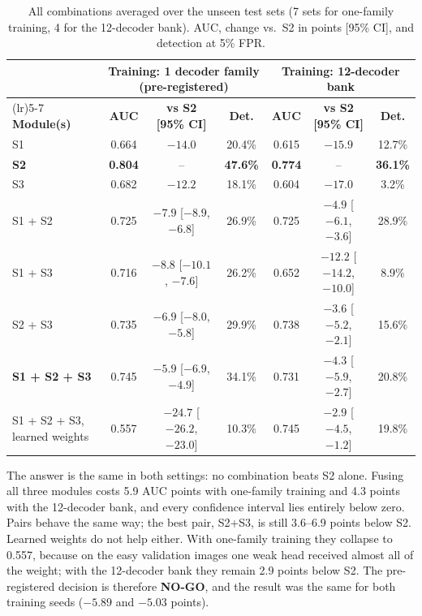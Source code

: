 \begin{table}[H]
\centering
\footnotesize
\caption{All combinations averaged over the unseen test sets (7 sets for one-family training, 4 for the 12-decoder bank). AUC, change vs.\ S2 in points [95\% CI], and detection at 5\% FPR.}
\label{tab:fusion}
\setlength{\tabcolsep}{3.5pt}
\begin{tabular}{>{\raggedright\arraybackslash}p{2.6cm} ccc ccc}
\toprule
& \multicolumn{3}{c}{\textbf{Training: 1 decoder family (pre-registered)}} & \multicolumn{3}{c}{\textbf{Training: 12-decoder bank}} \\
\cmidrule(lr){2-4}\cmidrule(lr){5-7}
\textbf{Module(s)} & \textbf{AUC} & \textbf{vs S2 [95\% CI]} & \textbf{Det.} & \textbf{AUC} & \textbf{vs S2 [95\% CI]} & \textbf{Det.} \\
\midrule
S1 & 0.664 & $-14.0$ & 20.4\% & 0.615 & $-15.9$ & 12.7\% \\
\textbf{S2} & \textbf{0.804} & -- & \textbf{47.6\%} & \textbf{0.774} & -- & \textbf{36.1\%} \\
S3 & 0.682 & $-12.2$ & 18.1\% & 0.604 & $-17.0$ & 3.2\% \\
\midrule
S1 + S2 & 0.725 & $-7.9$ [$-8.9$, $-6.8$] & 26.9\% & 0.725 & $-4.9$ [$-6.1$, $-3.6$] & 28.9\% \\
S1 + S3 & 0.716 & $-8.8$ [$-10.1$, $-7.6$] & 26.2\% & 0.652 & $-12.2$ [$-14.2$, $-10.0$] & 8.9\% \\
S2 + S3 & 0.735 & $-6.9$ [$-8.0$, $-5.8$] & 29.9\% & 0.738 & $-3.6$ [$-5.2$, $-2.1$] & 15.6\% \\
\textbf{S1 + S2 + S3} & 0.745 & $\mathbf{-5.9}$ [$-6.9$, $-4.9$] & 34.1\% & 0.731 & $\mathbf{-4.3}$ [$-5.9$, $-2.7$] & 20.8\% \\
S1 + S2 + S3, learned weights & 0.557 & $-24.7$ [$-26.2$, $-23.0$] & 10.3\% & 0.745 & $-2.9$ [$-4.5$, $-1.2$] & 19.8\% \\
\bottomrule
\end{tabular}
\end{table}

The answer is the same in both settings: no combination beats S2 alone. Fusing all three modules costs 5.9 AUC points with one-family training and 4.3 points with the 12-decoder bank, and every confidence interval lies entirely below zero. Pairs behave the same way; the best pair, S2+S3, is still 3.6--6.9 points below S2. Learned weights do not help either. With one-family training they collapse to 0.557, because on the easy validation images one weak head received almost all of the weight; with the 12-decoder bank they remain 2.9 points below S2. The pre-registered decision is therefore \textbf{NO-GO}, and the result was the same for both training seeds ($-5.89$ and $-5.03$ points).


